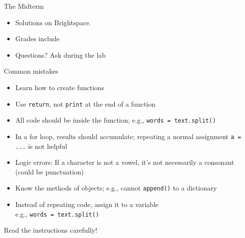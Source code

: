 \documentclass[aspectratio=169,usenames,dvipsnames]{beamer}
\begin{document}
\begin{frame}{The Midterm}
    \begin{itemize}
        \item Solutions on Brightspace.
        \item Grades include 
        \item Questions? Ask during the lab
    \end{itemize}
\end{frame}

\begin{frame}[fragile]{Common mistakes}
    \begin{itemize}
        \item Learn how to create functions
        \item Use \lstinline{return}, not \lstinline{print} at the end of a function
        \item All code should be inside the function; e.g., \lstinline{words = text.split()}
        \item In a for loop, results should accumulate; repeating a normal assignment \lstinline{a = ...} is not helpful
        \item Logic errors: If a character is not a vowel, it's not necessarily a consonant (could be punctuation)
        \item Know the methods of objects; e.g., cannot \lstinline{append()} to a dictionary

        \item Instead of repeating code, assign it to a variable \\
            e.g., \lstinline{words = text.split()}
    \end{itemize}

    \vspace{1em} Read the instructions carefully!
\end{frame}
\end{document}

